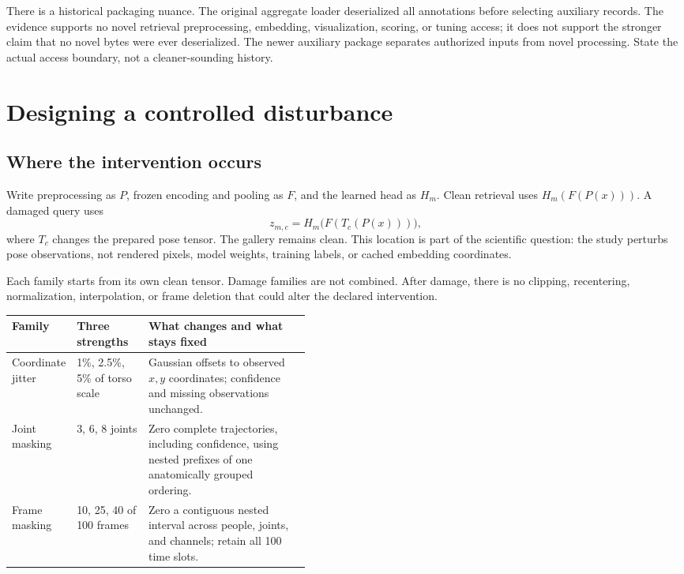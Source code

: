 There is a historical packaging nuance. The original aggregate loader
deserialized all annotations before selecting auxiliary records. The evidence
supports no novel retrieval preprocessing, embedding, visualization, scoring,
or tuning access; it does not support the stronger claim that no novel bytes
were ever deserialized. The newer auxiliary package separates authorized inputs
from novel processing. State the actual access boundary, not a cleaner-sounding
history.


\section{Designing a controlled disturbance}\label{sec:corruption}
\subsection{Where the intervention occurs}
Write preprocessing as $P$, frozen encoding and pooling as $F$, and the learned
head as $H_m$. Clean retrieval uses $H_m(F(P(x)))$. A damaged query uses
\[
 z_{m,c}=H_m\bigl(F(T_c(P(x)))\bigr),
\]
where $T_c$ changes the prepared pose tensor. The gallery remains clean.
This location is part of the scientific question: the study perturbs pose
observations, not rendered pixels, model weights, training labels, or cached
embedding coordinates.

Each family starts from its own clean tensor. Damage families are not combined.
After damage, there is no clipping, recentering, normalization, interpolation,
or frame deletion that could alter the declared intervention.

\begin{tabularx}{\linewidth}{@{}P{0.20\linewidth}P{0.24\linewidth}Y@{}}
\toprule Family & Three strengths & What changes and what stays fixed\\\midrule
Coordinate jitter & 1\%, 2.5\%, 5\% of torso scale & Gaussian offsets to observed
$x,y$ coordinates; confidence and missing observations unchanged.\\\addlinespace
Joint masking & 3, 6, 8 joints & Zero complete trajectories, including confidence,
using nested prefixes of one anatomically grouped ordering.\\\addlinespace
Frame masking & 10, 25, 40 of 100 frames & Zero a contiguous nested interval across
people, joints, and channels; retain all 100 time slots.\\\bottomrule
\end{tabularx}

